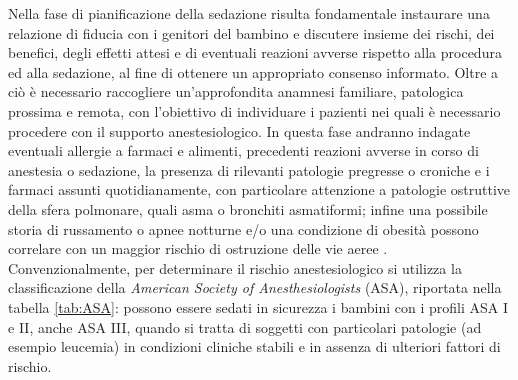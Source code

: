 Nella fase di pianificazione della sedazione risulta fondamentale instaurare una relazione di fiducia con i genitori del bambino e discutere insieme dei rischi, dei benefici, degli effetti attesi e di eventuali reazioni avverse rispetto alla procedura ed alla sedazione, al fine di ottenere un appropriato consenso informato. Oltre a ciò è necessario raccogliere un'approfondita anamnesi familiare, patologica prossima e remota, con l'obiettivo di individuare i pazienti nei quali è necessario procedere con il supporto anestesiologico. In questa fase andranno indagate eventuali allergie a farmaci e alimenti, precedenti reazioni avverse in corso di anestesia o sedazione, la presenza di rilevanti patologie pregresse o croniche e i farmaci assunti quotidianamente, con particolare attenzione a patologie ostruttive della sfera polmonare, quali asma o bronchiti asmatiformi; infine una possibile storia di russamento o apnee notturne e/o una condizione di obesità possono correlare con un maggior rischio di ostruzione delle vie aeree \cite{Simeupsedazione, Guidelines2019}.
Convenzionalmente, per determinare il rischio anestesiologico si utilizza la classificazione della \emph {American Society of Anesthesiologists} (ASA), riportata nella tabella \ref{tab:ASA}: possono essere sedati in sicurezza i bambini con i profili ASA I e II, anche ASA III, quando si tratta di soggetti con particolari patologie (ad esempio leucemia) in condizioni cliniche stabili e in assenza di ulteriori fattori di rischio. 

\bigskip

